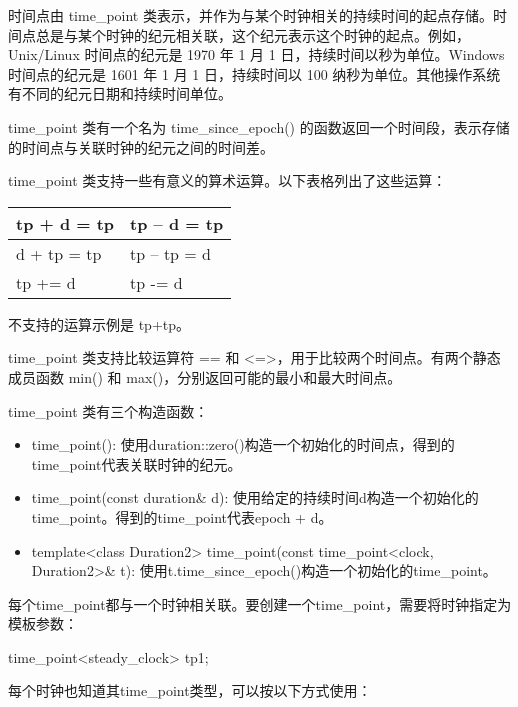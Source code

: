 
时间点由 time\_point 类表示，并作为与某个时钟相关的持续时间的起点存储。时间点总是与某个时钟的纪元相关联，这个纪元表示这个时钟的起点。例如，Unix/Linux 时间点的纪元是 1970 年 1 月 1 日，持续时间以秒为单位。Windows 时间点的纪元是 1601 年 1 月 1 日，持续时间以 100 纳秒为单位。其他操作系统有不同的纪元日期和持续时间单位。

time\_point 类有一个名为 time\_since\_epoch() 的函数返回一个时间段，表示存储的时间点与关联时钟的纪元之间的时间差。

time\_point 类支持一些有意义的算术运算。以下表格列出了这些运算：

\begin{longtable}{|l|l|}
\hline
tp + d = tp & tp – d = tp \\ \hline
\endfirsthead
%
\endhead
%
d + tp = tp & tp – tp = d \\ \hline
tp += d     & tp -= d     \\ \hline
\end{longtable}

不支持的运算示例是 tp+tp。

time\_point 类支持比较运算符 == 和 <=>，用于比较两个时间点。有两个静态成员函数 min() 和 max()，分别返回可能的最小和最大时间点。

time\_point 类有三个构造函数：

\begin{itemize}
\item
time\_point(): 使用duration::zero()构造一个初始化的时间点，得到的time\_point代表关联时钟的纪元。

\item
time\_point(const duration\& d): 使用给定的持续时间d构造一个初始化的time\_point。得到的time\_point代表epoch + d。

\item
template<class Duration2> time\_point(const time\_point<clock, Duration2>\& t): 使用t.time\_since\_epoch()构造一个初始化的time\_point。
\end{itemize}

每个time\_point都与一个时钟相关联。要创建一个time\_point，需要将时钟指定为模板参数：

\begin{cpp}
time_point<steady_clock> tp1;
\end{cpp}

每个时钟也知道其time\_point类型，可以按以下方式使用：

